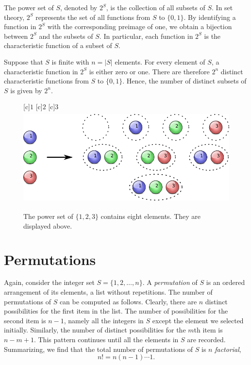 \begin{example}
The power set of $S$, denoted by $2^S$, is the collection of all subsets of $S$.
In set theory, $2^S$ represents the set of all functions from $S$ to $\{ 0, 1\}$.
By identifying a function in $2^S$ with the corresponding preimage of one, we obtain a bijection between $2^S$ and the subsets of $S$.
In particular, each function in $2^S$ is the characteristic function of a subset of $S$.

Suppose that $S$ is finite with $n = |S|$ elements.
For every element of $S$, a characteristic function in $2^S$ is either zero or one.
There are therefore $2^n$ distinct characteristic functions from $S$ to $\{ 0, 1\}$.
Hence, the number of distinct subsets of $S$ is given by $2^n$.

\begin{figure}[htb!]
\begin{center}
\begin{psfrags}
[c]{$1$}
[c]{$2$}
[c]{$3$}
\includegraphics[height=4.965cm]{Figures/4Chapter/powerset}
\end{psfrags}
\caption{The power set of $\{ 1, 2, 3 \}$ contains eight elements.
They are displayed above.}
\label{figure:PowerSet}
\end{center}
\end{figure}
\end{example}


\section{Permutations}

Again, consider the integer set $S = \{ 1, 2, \ldots, n \}$.
A \emph{permutation} of $S$ is an ordered arrangement of its elements, a list without repetitions. 
The number of permutations of $S$ can be computed as follows.
Clearly, there are $n$ distinct possibilities for the first item in the list.
The number of possibilities for the second item is $n-1$, namely all the integers in $S$ except the element we selected initially.
Similarly, the number of distinct possibilities for the $m$th item is $n - m + 1$.
This pattern continues until all the elements in $S$ are recorded.
Summarizing, we find that the total number of permutations of $S$ is $n$ \emph{factorial}, 
\begin{equation*}
n! = n (n-1) \cdots 1 .
\end{equation*}

